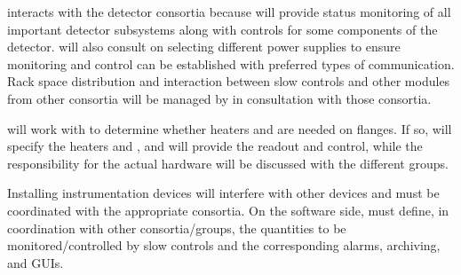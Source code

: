  interacts with the detector consortia because  will provide status monitoring of all important detector subsystems along with controls for some components of the detector.
 will also consult on selecting different power supplies to ensure monitoring and control can be established with preferred types of communication. 
Rack space distribution and interaction between slow controls and other modules from other consortia will be managed by  in consultation with those consortia. 

 will work with  to determine whether heaters and  are needed on flanges. If so,  will specify the heaters and  , and will provide the readout and control, while the responsibility for the actual hardware will be discussed with the different groups.

Installing instrumentation devices will interfere with other devices and must be coordinated with the appropriate consortia.  
On the software side,  must define, in coordination with other consortia/groups, the quantities to be monitored/controlled by slow controls and the corresponding alarms,
archiving, and GUIs. 




